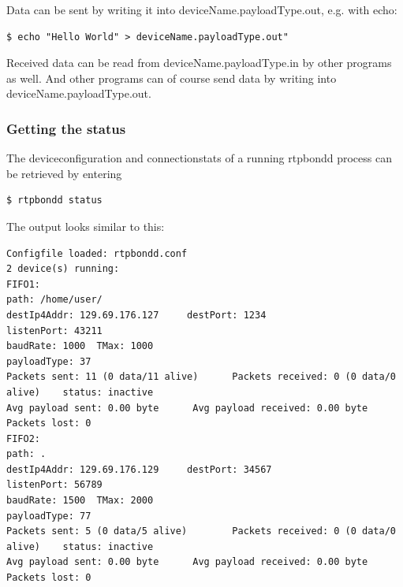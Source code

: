 \documentclass[a4paper]{book}%
\begin{document}
Data can be sent by writing it into deviceName.payloadType.out, e.g. with echo:

\begin{verbatim}
$ echo "Hello World" > deviceName.payloadType.out"
\end{verbatim}

Received data can be read from deviceName.payloadType.in by other programs as well. And other programs can of course send data by writing into deviceName.payloadType.out.

\subsubsection{Getting the status}

The deviceconfiguration and connectionstats of a running rtpbondd process can be retrieved by entering

\begin{verbatim}
$ rtpbondd status
\end{verbatim}

The output looks similar to this:

\begin{verbatim}
Configfile loaded: rtpbondd.conf                         
2 device(s) running:                                    
FIFO1:                                                  
path: /home/user/                               
destIp4Addr: 129.69.176.127     destPort: 1234  
listenPort: 43211                               
baudRate: 1000  TMax: 1000                      
payloadType: 37                                 
Packets sent: 11 (0 data/11 alive)      Packets received: 0 (0 data/0 alive)    status: inactive
Avg payload sent: 0.00 byte      Avg payload received: 0.00 byte                                
Packets lost: 0                                                                                 
FIFO2:                                                                                                  
path: .                                                                                         
destIp4Addr: 129.69.176.129     destPort: 34567                                                 
listenPort: 56789                                                                               
baudRate: 1500  TMax: 2000                                                                      
payloadType: 77                                                                                 
Packets sent: 5 (0 data/5 alive)        Packets received: 0 (0 data/0 alive)    status: inactive
Avg payload sent: 0.00 byte      Avg payload received: 0.00 byte                                
Packets lost: 0             
\end{verbatim}
\end{document}
